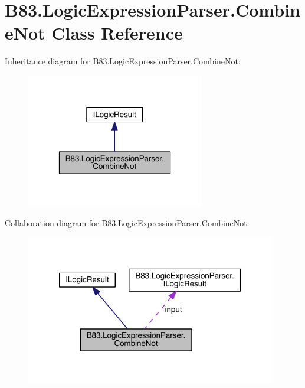 \hypertarget{class_b83_1_1_logic_expression_parser_1_1_combine_not}{}\section{B83.\+Logic\+Expression\+Parser.\+Combine\+Not Class Reference}
\label{class_b83_1_1_logic_expression_parser_1_1_combine_not}


Inheritance diagram for B83.\+Logic\+Expression\+Parser.\+Combine\+Not\+:\nopagebreak
\begin{figure}[H]
\begin{center}
\leavevmode
\includegraphics[width=220pt]{class_b83_1_1_logic_expression_parser_1_1_combine_not__inherit__graph}
\end{center}
\end{figure}


Collaboration diagram for B83.\+Logic\+Expression\+Parser.\+Combine\+Not\+:\nopagebreak
\begin{figure}[H]
\begin{center}
\leavevmode
\includegraphics[width=309pt]{class_b83_1_1_logic_expression_parser_1_1_combine_not__coll__graph}
\end{center}
\end{figure}
